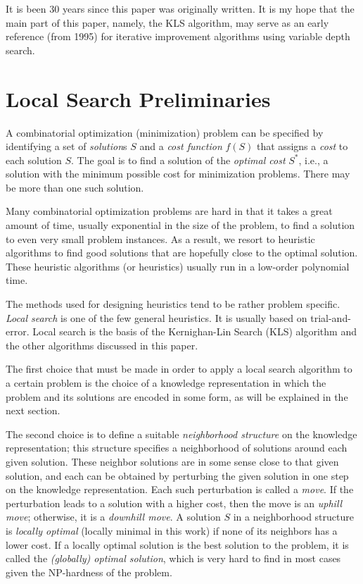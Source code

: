 \documentclass{article}
\begin{document}
It is been 30 years since this paper was originally written. It is my
hope that the main part of this paper, namely, the KLS algorithm, may
serve as an early reference (from 1995) for iterative improvement
algorithms using variable depth search.

\section{Local Search Preliminaries}
\label{sec:local}

A combinatorial optimization (minimization) problem can be specified
by identifying a set of {\em solution}s $S$ and a {\em cost function}
$f(S)$ that assigns a {\em cost} to each solution $S$. The goal is to
find a solution of the {\em optimal cost} $S^{*}$, i.e., a solution
with the minimum possible cost for minimization problems. There may be
more than one such solution.

Many combinatorial optimization problems are hard in that it takes a
great amount of time, usually exponential in the size of the problem,
to find a solution to even very small problem instances. As a result,
we resort to heuristic algorithms to find good solutions that are
hopefully close to the optimal solution. These heuristic algorithms
(or heuristics) usually run in a low-order polynomial time.

The methods used for designing heuristics tend to be rather problem
specific. {\em Local search} is one of the few general heuristics. It
is usually based on trial-and-error. Local search is the basis of the
Kernighan-Lin Search (KLS) algorithm and the other algorithms
discussed in this paper.

The first choice that must be made in order to apply a local search
algorithm to a certain problem is the choice of a knowledge
representation in which the problem and its solutions are encoded in
some form, as will be explained in the next section.

The second choice is to define a suitable {\em neighborhood structure}
on the knowledge representation; this structure specifies a
neighborhood of solutions around each given solution. These neighbor
solutions are in some sense close to that given solution, and each can
be obtained by perturbing the given solution in one step on the
knowledge representation. Each such perturbation is called a {\em
  move}. If the perturbation leads to a solution with a higher cost,
then the move is an {\em uphill move}; otherwise, it is a {\em
  downhill move}. A solution $S$ in a neighborhood structure is {\em
  locally optimal} (locally minimal in this work) if none of its
neighbors has a lower cost. If a locally optimal solution is the best
solution to the problem, it is called the {\em (globally) optimal
  solution}, which is very hard to find in most cases given the
NP-hardness of the problem.
\end{document}
